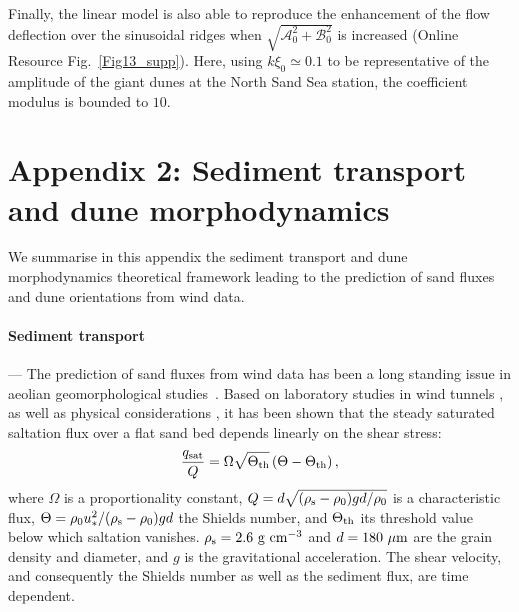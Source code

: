 Finally, the linear model is also able to reproduce the enhancement of the flow deflection over the sinusoidal ridges when $\sqrt{\mathcal{A}_{0}^{2} + \mathcal{B}_{0}^{2}}$ is increased (Online Resource Fig.~\ref{Fig13_supp}). Here, using $k\xi_0 \simeq 0.1$ to be representative of the amplitude of the giant dunes at the North Sand Sea station, the coefficient modulus is bounded to $10$.


\section*{Appendix 2: Sediment transport and dune morphodynamics}

We summarise in this appendix the sediment transport and dune morphodynamics theoretical framework leading to the prediction of sand fluxes and dune orientations from wind data.

\paragraph{Sediment transport} ---
The prediction of sand fluxes from wind data has been a long standing issue in aeolian geomorphological studies~\citep{Fryberger79, Pearce2005, Sherman2012, Shen2019}. Based on laboratory studies in wind tunnels \citep{Rasmussen96, Iversen99, Creyssels2009, Ho2011}, as well as physical considerations \citep{Ungar1987, Andreotti2004bis, Duran2011, Pahtz2020}, it has been shown that the steady saturated saltation flux over a flat sand bed depends linearly on the shear stress:
%
\begin{equation}
\label{transport_law_quadratic}
\frac{q_{\textup{sat}}}{Q} = \Omega\sqrt{\Theta_{\textup{th}}}\left(\Theta - \Theta_{\textup{th}}\right),
\end{equation}
%
where $\Omega$ is a proportionality constant, $Q = d\sqrt{(\rho_{\textup{s}} - \rho_{0})gd/\rho_{0}}$ is a characteristic flux, $\Theta = \rho_{0} u_{*}^{2}/(\rho_{\textup{s}} - \rho_{0})gd$ the Shields number, and $\Theta_{\textup{th}}$ its threshold value below which saltation vanishes. $\rho_{\textup{s}} = 2.6~\textup{g}~\textup{cm}^{-3}$ and $d=180~\mu\textup{m}$ are the grain density and diameter, and $g$ is the gravitational acceleration. The shear velocity, and consequently the Shields number as well as the sediment flux, are time dependent.

